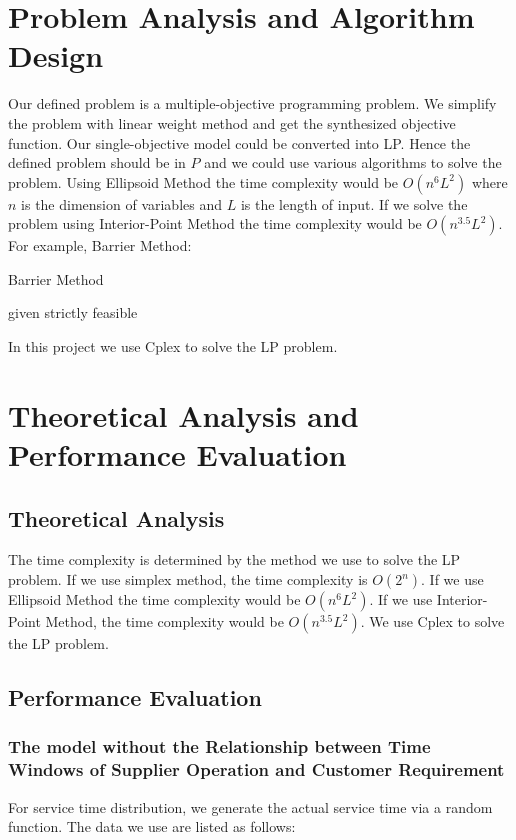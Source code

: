 \documentclass[12pt,a4paper]{article}
\begin{document}
\section{Problem Analysis and Algorithm Design}
Our defined problem is a multiple-objective programming problem. We simplify the problem with linear weight method and get the synthesized objective function. Our single-objective model could be converted into LP. Hence the defined problem should be in $P$ and we could use various algorithms to solve the problem. Using Ellipsoid Method the time complexity would be $O(n^6L^2)$ where $n$ is the dimension of variables and $L$ is the length of input. If we solve the problem using Interior-Point Method the time complexity would be $O(n^{3.5}L^2)$.\\
For example, Barrier Method\cite{Convex}:\\
\begin{algorithm}[H]
\caption{Barrier Method}
 given strictly feasible\\
\end{algorithm}
In this project we use Cplex to solve the LP problem.
\newpage
\section{Theoretical Analysis and Performance Evaluation}
\subsection{Theoretical Analysis}
The time complexity is determined by the method we use to solve the LP problem. If we use simplex method, the time complexity is $O(2^n)$. If we use Ellipsoid Method the time complexity would be $O(n^6L^2)$. If we use Interior-Point Method, the time complexity would be $O(n^{3.5}L^2)$. We use Cplex to solve the LP problem.
\subsection{Performance Evaluation}
\subsubsection{The model without the Relationship between Time Windows of Supplier Operation and Customer Requirement}
For service time distribution, we generate the actual service time via a random function. The data we use are listed as follows:\\
\end{document}
